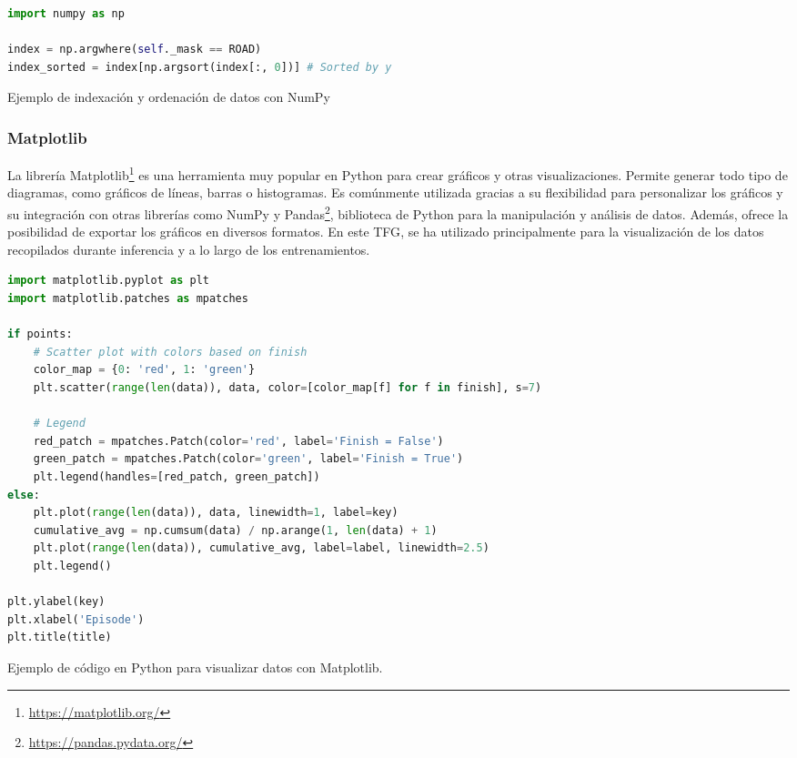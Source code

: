 \begin{code}[h]
\begin{lstlisting}[language=Python]
import numpy as np

index = np.argwhere(self._mask == ROAD)
index_sorted = index[np.argsort(index[:, 0])] # Sorted by y

\end{lstlisting}
\caption[Ejemplo de indexación y ordenación de datos con NumPy]{Ejemplo de indexación y ordenación de datos con NumPy}
\label{cod:numpy}
\end{code}

\subsubsection{Matplotlib}
\label{sec:plot}

La librería Matplotlib\footnote{\url{https://matplotlib.org/}} es una herramienta muy popular en Python para crear gráficos y otras visualizaciones. Permite generar todo tipo de diagramas, como gráficos de líneas, barras o histogramas. Es comúnmente utilizada gracias a su flexibilidad para personalizar los gráficos y su integración con otras librerías como NumPy y Pandas\footnote{\url{https://pandas.pydata.org/}}, biblioteca de Python para la manipulación y análisis de datos. Además, ofrece la posibilidad de exportar los gráficos en diversos formatos. En este \ac{TFG}, se ha utilizado principalmente para la visualización de los datos recopilados durante inferencia y a lo largo de los entrenamientos.

\begin{code}[h]
\begin{lstlisting}[language=Python]
import matplotlib.pyplot as plt
import matplotlib.patches as mpatches

if points:
	# Scatter plot with colors based on finish
	color_map = {0: 'red', 1: 'green'}
	plt.scatter(range(len(data)), data, color=[color_map[f] for f in finish], s=7)
	
	# Legend
	red_patch = mpatches.Patch(color='red', label='Finish = False')
	green_patch = mpatches.Patch(color='green', label='Finish = True')
	plt.legend(handles=[red_patch, green_patch])  
else:
	plt.plot(range(len(data)), data, linewidth=1, label=key)
	cumulative_avg = np.cumsum(data) / np.arange(1, len(data) + 1)
	plt.plot(range(len(data)), cumulative_avg, label=label, linewidth=2.5)
	plt.legend()

plt.ylabel(key)
plt.xlabel('Episode')
plt.title(title)
\end{lstlisting}
\caption[Ejemplo de código en Python para visualizar datos con Matplotlib]{Ejemplo de código en Python para visualizar datos con Matplotlib.}
\label{cod:plot}
\end{code}

